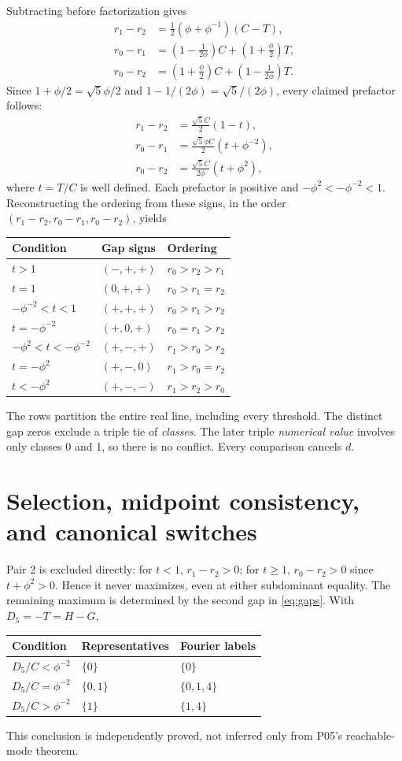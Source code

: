 \documentclass[11pt]{article}
\begin{document}
Subtracting before factorization gives
\begin{align*}
 r_1-r_2&=\tfrac12(\phi+\phi^{-1})(C-T),\\
 r_0-r_1&=(1-\tfrac1{2\phi})C+(1+\tfrac\phi2)T,\\
 r_0-r_2&=(1+\tfrac\phi2)C+(1-\tfrac1{2\phi})T.
\end{align*}
Since $1+\phi/2=\sqrt5\phi/2$ and
$1-1/(2\phi)=\sqrt5/(2\phi)$, every claimed prefactor follows:
\begin{align}
 r_1-r_2&=\frac{\sqrt5 C}{2}(1-t),\nonumber\\
 r_0-r_1&=\frac{\sqrt5\phi C}{2}(t+\phi^{-2}),\label{eq:gaps}\\
 r_0-r_2&=\frac{\sqrt5 C}{2\phi}(t+\phi^2),\nonumber
\end{align}
where $t=T/C$ is well defined. Each prefactor is positive and
$-\phi^2<-\phi^{-2}<1$. Reconstructing the ordering from these signs,
in the order $(r_1-r_2,r_0-r_1,r_0-r_2)$, yields
\begin{center}
\begin{tabular}{@{}lll@{}}
\toprule Condition&Gap signs&Ordering\\\midrule
$t>1$&$(-,+,+)$&$r_0>r_2>r_1$\\
$t=1$&$(0,+,+)$&$r_0>r_1=r_2$\\
$-\phi^{-2}<t<1$&$(+,+,+)$&$r_0>r_1>r_2$\\
$t=-\phi^{-2}$&$(+,0,+)$&$r_0=r_1>r_2$\\
$-\phi^2<t<-\phi^{-2}$&$(+,-,+)$&$r_1>r_0>r_2$\\
$t=-\phi^2$&$(+,-,0)$&$r_1>r_0=r_2$\\
$t<-\phi^2$&$(+,-,-)$&$r_1>r_2>r_0$\\\bottomrule
\end{tabular}
\end{center}
The rows partition the entire real line, including every threshold.
The distinct gap zeros exclude a triple tie of \emph{classes}.
The later triple \emph{numerical value} involves only classes 0 and 1,
so there is no conflict. Every comparison cancels $d$.

\section{Selection, midpoint consistency, and canonical switches}
\label{sec:selection}
Pair 2 is excluded directly: for $t<1$, $r_1-r_2>0$; for $t\ge1$,
$r_0-r_2>0$ since $t+\phi^2>0$. Hence it never maximizes, even
at either subdominant equality. The remaining maximum is determined
by the second gap in \eqref{eq:gaps}. With $D_5=-T=H-G$,
\begin{center}
\begin{tabular}{@{}lll@{}}
\toprule Condition&Representatives&Fourier labels\\\midrule
$D_5/C<\phi^{-2}$&$\{0\}$&$\{0\}$\\
$D_5/C=\phi^{-2}$&$\{0,1\}$&$\{0,1,4\}$\\
$D_5/C>\phi^{-2}$&$\{1\}$&$\{1,4\}$\\\bottomrule
\end{tabular}
\end{center}
This conclusion is independently proved, not inferred only from P05's
reachable-mode theorem.
\end{document}
